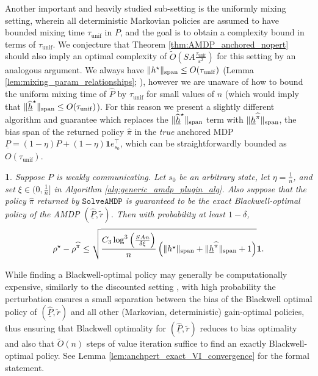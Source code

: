 \documentclass{article}
\theoremstyle{plain}
\newtheorem{thm}{\protect\theoremname}
\theoremstyle{plain}
\theoremstyle{remark}
\theoremstyle{plain}
\theoremstyle{plain}
\providecommand{\theoremname}{Theorem}
\newcommand{\Phat}{\widehat{P}}
\newcommand{\one}{\mathbf{1}}
\newcommand{\pihat}{\widehat{\pi}}
\newcommand{\hhat}{\widehat{h}}
\newcommand{\Otilde}{\widetilde{O}}
\newcommand{\tmix}{\tau_{\mathrm{unif}}}
\newcommand{\SolveAMDP}{\texttt{SolveAMDP}}
\newcommand{\Phatanc}{\underline{\Phat}}
\newcommand{\hhatanc}{\underline{\hhat}}
\newcommand{\Panc}{\underline{P}}
\newcommand{\hanc}{\underline{h}}
\begin{document}
Another important and heavily studied sub-setting is the uniformly mixing setting, wherein all deterministic Markovian policies are assumed to have bounded mixing time $\tmix$ in $P$, and the goal is to obtain a complexity bound in terms of $\tmix$. We conjecture that Theorem \ref{thm:AMDP_anchored_nopert} should also imply an optimal complexity of $\Otilde(SA\frac{\tmix}{\varepsilon^2})$ for this setting by an analogous argument. We always have $\spannorm{h^\star} \leq O(\tmix)$ (Lemma \ref{lem:mixing_param_relationships}; \citealt{wang_near_2022}), however we are unaware of how to bound the uniform mixing time of $\Phat$ by $\tmix$ for small values of $n$ (which would imply that $\spannorm{\hhatanc^\star} \leq O(\tmix)$). For this reason we present a slightly different algorithm and guarantee which replaces the $\spannorm{\hhatanc^\star}$ term with $\spannorm{\hanc^{\pihat}}$, the bias span of the returned policy $\pihat$ in the \textit{true} anchored MDP $\Panc = (1-\eta) P + (1-\eta) \one e_{s_0}^\top$, which can be straightforwardly bounded as $O(\tmix)$.
\begin{thm}
\label{thm:AMDP_anchored_perturbed}
    Suppose $P$ is weakly communicating. Let $s_0$ be an arbitrary state, let $\eta = \frac{1}{n}$, and set $\xi \in (0, \frac{1}{n}]$ in Algorithm \ref{alg:generic_amdp_plugin_alg}. Also suppose that the policy $\pihat$ returned by $\SolveAMDP$ is guaranteed to be the exact Blackwell-optimal policy of the AMDP $(\Phatanc, \widetilde{r})$.
    Then with probability at least $1 - \delta$,
    \begin{align*}
        \rho^\star - \rho^{\pihat}  \leq \sqrt{\frac{C_3  \log^3 \left( \frac{SAn}{ \delta \xi}\right) }{n}\left( \spannorm{h^\star} + \spannorm{\hanc^{\pihat}} + 1\right) } \one.
    \end{align*}
\end{thm}
While finding a Blackwell-optimal policy may generally be computationally expensive, similarly to the discounted setting \cite{li_breaking_2020}, with high probability the perturbation ensures a small separation between the bias of the Blackwell optimal policy of $(\Phatanc, \widetilde{r})$ and all other (Markovian, deterministic) gain-optimal policies, thus ensuring that Blackwell optimality for $(\Phatanc, \widetilde{r})$ reduces to bias optimality and also that $\Otilde\left(n \right)$ steps of value iteration suffice to find an exactly Blackwell-optimal policy. See Lemma \ref{lem:anchpert_exact_VI_convergence} for the formal statement.
\end{document}
